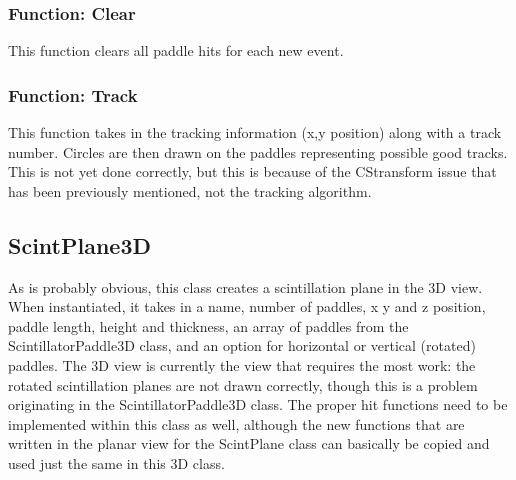 \documentclass[12pt]{article}
\numberwithin{equation}{section}
\begin{document}
\subsubsection{Function: Clear}
This function clears all paddle hits for each new event.

\subsubsection{Function: Track}
This function takes in the tracking information (x,y position) along with a track number. Circles are then drawn on the paddles representing possible good tracks. This is not yet done correctly, but this is because of the CStransform issue that has been previously mentioned, not the tracking algorithm.

\subsection{ScintPlane3D}
As is probably obvious, this class creates a scintillation plane in the 3D view. When instantiated, it takes in a name, number of paddles, x y and z position, paddle length, height and thickness, an array of paddles from the ScintillatorPaddle3D class, and an option for horizontal or vertical (rotated) paddles. The 3D view is currently the view that requires the most work: the rotated scintillation planes are not drawn correctly, though this is a problem originating in the ScintillatorPaddle3D class. The proper hit functions need to be implemented within this class as well, although the new functions that are written in the planar view for the ScintPlane class can basically be copied and used just the same in this 3D class.
\end{document}
